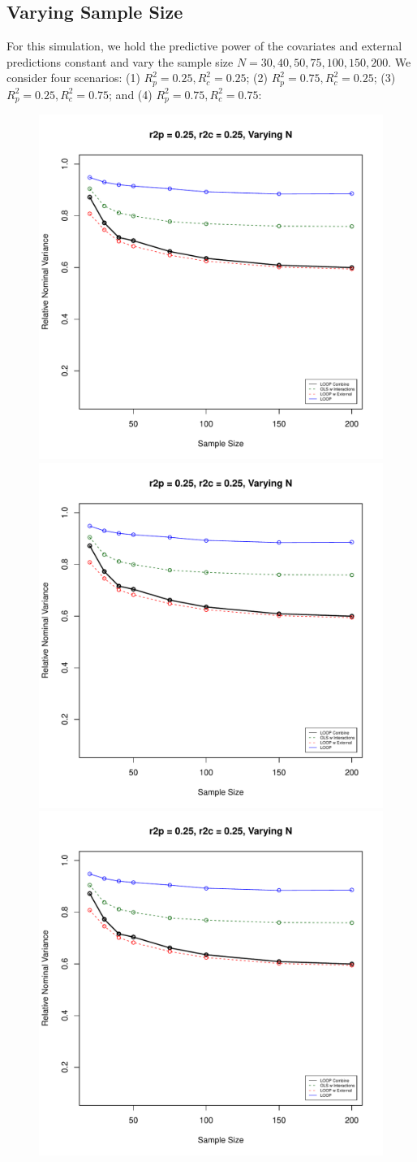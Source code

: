 \subsection{Varying Sample Size}
For this simulation, we hold the predictive power of the covariates and external predictions constant and vary the sample size $N = 30, 40, 50, 75, 100, 150, 200$. We consider four scenarios: (1) $R^2_p = 0.25, R^2_c = 0.25$; (2) $R^2_p = 0.75, R^2_c = 0.25$; (3) $R^2_p = 0.25, R^2_c = 0.75$; and (4) $R^2_p = 0.75, R^2_c = 0.75$:
\begin{figure}[H]
	\centering
	\includegraphics[width=.49\linewidth]{images/sampsize.pdf}
	\includegraphics[width=.49\linewidth,page = 2]{images/sampsize.pdf} \quad
	\smallskip
	\includegraphics[width=.49\linewidth,page = 3]{images/sampsize.pdf}

\end{figure}
